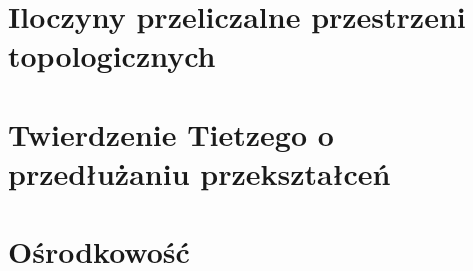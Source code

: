 \section{Iloczyny przeliczalne przestrzeni topologicznych}

\section{Twierdzenie Tietzego o przedłużaniu przekształceń}

\section{Ośrodkowość}
